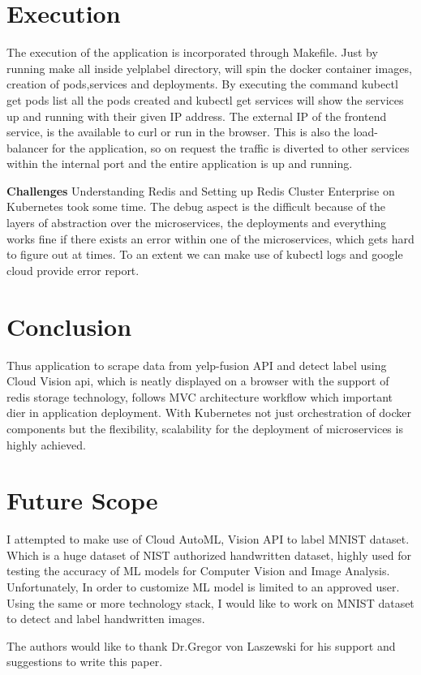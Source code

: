   \section{Execution}
  The execution of the application is incorporated through
  Makefile. Just by running make all inside yelplabel directory, will
  spin the docker container images, creation of pods,services and
  deployments. By executing the command kubectl get pods list all the
  pods created and kubectl get services will show the services up and
  running with their given IP address. The external IP of the frontend
  service, is the available to curl or run in the browser. This is
  also the load-balancer for the application, so on request the
  traffic is diverted to other services within the internal port and
  the entire application is up and running.
  
\item \textbf{Challenges} Understanding Redis and Setting up Redis
  Cluster Enterprise on Kubernetes took some time. The debug aspect is
  the difficult because of the layers of abstraction over the
  microservices, the deployments and everything works fine if there
  exists an error within one of the microservices, which gets hard to
  figure out at times. To an extent we can make use of kubectl logs
  and google cloud provide error report.
  
  \section{Conclusion}
  Thus application to scrape data from yelp-fusion API and detect
  label using Cloud Vision api, which is neatly displayed on a browser
  with the support of redis storage technology, follows MVC
  architecture workflow which important dier in application
  deployment. With Kubernetes not just orchestration of docker
  components but the flexibility, scalability for the deployment of
  microservices is highly achieved.
  
  \section{Future Scope}
  I attempted to make use of Cloud AutoML, Vision API to label MNIST
  dataset. Which is a huge dataset of NIST authorized handwritten
  dataset, highly used for testing the accuracy of ML models for
  Computer Vision and Image Analysis. Unfortunately, In order to
  customize ML model is limited to an approved user. Using the same or
  more technology stack, I would like to work on MNIST dataset to
  detect and label handwritten images.


  \begin{acks}

    The authors would like to thank Dr.Gregor von Laszewski for his
    support and suggestions to write this paper.
  

  \end{acks}

   
